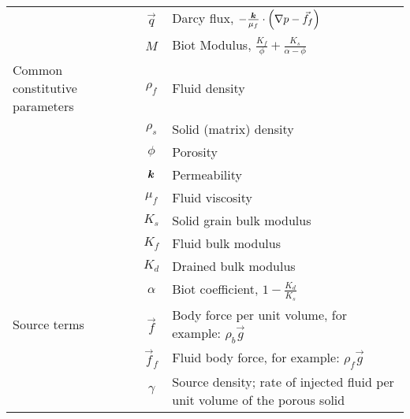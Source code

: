 \begin{table}[htbp]
\begin{tabular}{lcp{3.5in}}
                                   & $\vec{q}$           & Darcy flux, $-\frac{\bm{k}}{\mu_{f}} \cdot \left(\nabla p - \vec{f}_{f}\right)$                           \\
                                   & $M$                 & Biot Modulus, $\frac{K_{f}}{\phi} + \frac{K_{s}}{\alpha - \phi}$                                              \\
    \hline
    Common constitutive parameters & $\rho_{f}$          & Fluid density                                                                                                 \\
                                   & $\rho_{s}$          & Solid (matrix) density                                                                                        \\
                                   & $\phi$              & Porosity                                                                                                      \\
                                   & $\bm{k}$        & Permeability                                                                                                  \\
                                   & $\mu_{f}$           & Fluid viscosity                                                                                               \\
                                   & $K_{s}$             & Solid grain bulk modulus                                                                                      \\
                                   & $K_{f}$             & Fluid bulk modulus                                                                                            \\
                                   & $K_{d}$             & Drained bulk modulus                                                                                          \\
                                   & $\alpha$            & Biot coefficient, $1 - \frac{K_{d}}{K_{s}}$                                                                   \\
    \hline
    Source terms                   & $\vec{f}$           & Body force per unit volume, for example: $\rho_{b} \vec{g}$                                                   \\
                                   & $\vec{f}_{f}$       & Fluid body force, for example: $\rho_{f} \vec{g}$                                                             \\
                                   & $\gamma$            & Source density; rate of injected fluid per unit volume of the porous solid                                    \\
    \bottomrule
  \end{tabular}
\end{table}



